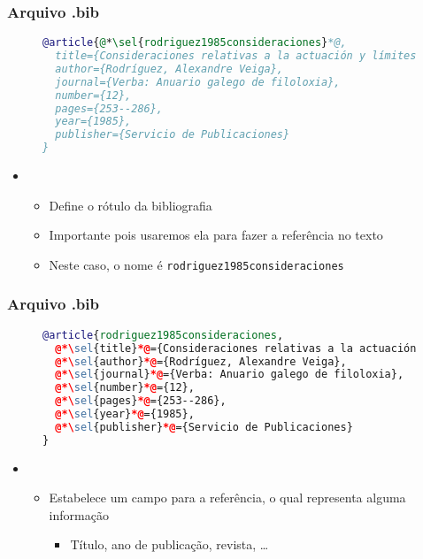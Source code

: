 \begin{frame}[fragile] \frametitle{Arquivo .bib}
\begin{figure}[!t]
\begin{lstlisting}[language=BibTeX]
@article{@*\sel{rodriguez1985consideraciones}*@,
  title={Consideraciones relativas a la actuación y límites de las oposiciones fonológicas interrupto/continuo y tenso/flojo en español},
  author={Rodríguez, Alexandre Veiga},
  journal={Verba: Anuario galego de filoloxia},
  number={12},
  pages={253--286},
  year={1985},
  publisher={Servicio de Publicaciones}
}
\end{lstlisting}
\end{figure}

\begin{itemize}
	\item {}
	\begin{itemize}
		\item Define o rótulo da bibliografia
		\item Importante pois usaremos ela para fazer a referência no texto
		\item Neste caso, o nome é \texttt{rodriguez1985consideraciones}
	\end{itemize}
\end{itemize}

\end{frame}

\begin{frame}[fragile] \frametitle{Arquivo .bib}
\begin{figure}[!t]
\begin{lstlisting}[language=BibTeX]
@article{rodriguez1985consideraciones,
  @*\sel{title}*@={Consideraciones relativas a la actuación y límites de las oposiciones fonológicas interrupto/continuo y tenso/flojo en español},
  @*\sel{author}*@={Rodríguez, Alexandre Veiga},
  @*\sel{journal}*@={Verba: Anuario galego de filoloxia},
  @*\sel{number}*@={12},
  @*\sel{pages}*@={253--286},
  @*\sel{year}*@={1985},
  @*\sel{publisher}*@={Servicio de Publicaciones}
}
\end{lstlisting}
\end{figure}

\begin{itemize}
	\item {}
	\begin{itemize}
		\item Estabelece um campo para a referência, o qual representa alguma informação
		\begin{itemize}
			\item Título, ano de publicação, revista, \ldots
		\end{itemize}
	\end{itemize}
\end{itemize}
\end{frame}

